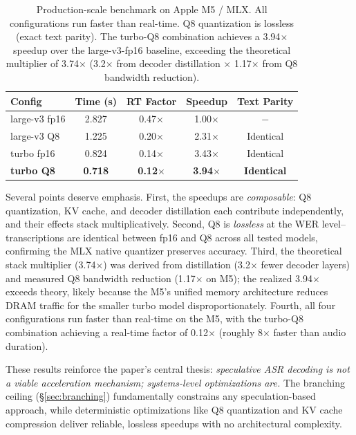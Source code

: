 \documentclass[11pt,a4paper]{article}
\begin{document}
\begin{table}[H]
\centering
\small
\begin{tabular}{@{}lcccc@{}}
\toprule
\textbf{Config} & \textbf{Time (s)} & \textbf{RT Factor} & \textbf{Speedup} & \textbf{Text Parity} \\
\midrule
large-v3 fp16 & 2.827 & 0.47$\times$ & 1.00$\times$ & $-$ \\
large-v3 Q8 & 1.225 & 0.20$\times$ & 2.31$\times$ & Identical \\
turbo fp16 & 0.824 & 0.14$\times$ & 3.43$\times$ & Identical \\
\textbf{turbo Q8} & \textbf{0.718} & \textbf{0.12$\times$} & \textbf{3.94$\times$} & \textbf{Identical} \\
\bottomrule
\end{tabular}
\caption{Production-scale benchmark on Apple M5 / MLX. All configurations run faster than real-time. Q8 quantization is lossless (exact text parity). The turbo-Q8 combination achieves a 3.94$\times$ speedup over the large-v3-fp16 baseline, exceeding the theoretical multiplier of 3.74$\times$ (3.2$\times$ from decoder distillation $\times$ 1.17$\times$ from Q8 bandwidth reduction).}
\label{tab:m5}
\end{table}

Several points deserve emphasis. First, the speedups are {\em composable}: Q8 quantization, KV cache, and decoder distillation each contribute independently, and their effects stack multiplicatively. Second, Q8 is {\em lossless} at the WER level--transcriptions are identical between fp16 and Q8 across all tested models, confirming the MLX native quantizer preserves accuracy. Third, the theoretical stack multiplier (3.74$\times$) was derived from distillation (3.2$\times$ fewer decoder layers) and measured Q8 bandwidth reduction (1.17$\times$ on M5); the realized 3.94$\times$ exceeds theory, likely because the M5's unified memory architecture reduces DRAM traffic for the smaller turbo model disproportionately. Fourth, all four configurations run faster than real-time on the M5, with the turbo-Q8 combination achieving a real-time factor of 0.12$\times$ (roughly 8$\times$ faster than audio duration).

These results reinforce the paper's central thesis: {\em speculative ASR decoding is not a viable acceleration mechanism; systems-level optimizations are.} The branching ceiling (\S\ref{sec:branching}) fundamentally constrains any speculation-based approach, while deterministic optimizations like Q8 quantization and KV cache compression deliver reliable, lossless speedups with no architectural complexity.
\end{document}
